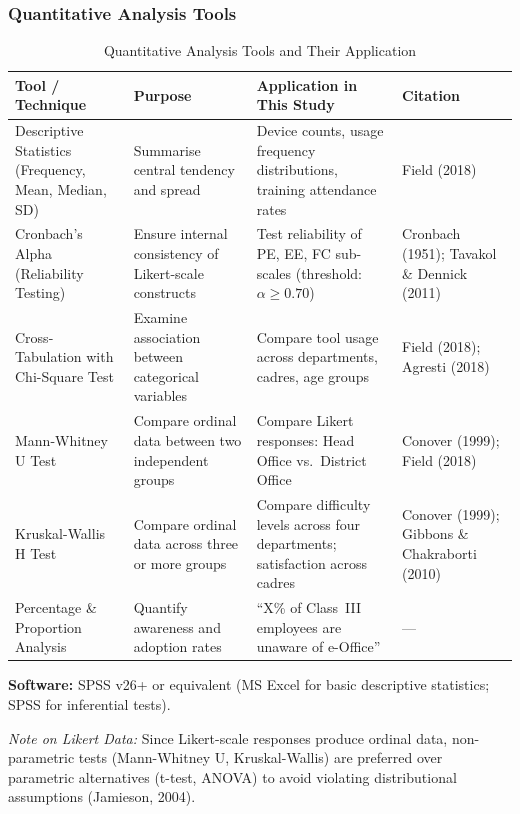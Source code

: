 \documentclass[12pt,a4paper]{article}
\begin{document}
\subsubsection{Quantitative Analysis Tools}

\begin{table}[H]
\centering
\caption{Quantitative Analysis Tools and Their Application}
\small
\begin{tabularx}{\textwidth}{L{3.2cm} L{2.8cm} X L{2.8cm}}
\toprule
\textbf{Tool / Technique} & \textbf{Purpose} & \textbf{Application in This Study} & \textbf{Citation} \\
\midrule
Descriptive Statistics (Frequency, Mean, Median, SD) & Summarise central tendency and spread & Device counts, usage frequency distributions, training attendance rates & Field (2018) \\[6pt]
Cronbach's Alpha (Reliability Testing) & Ensure internal consistency of Likert-scale constructs & Test reliability of PE, EE, FC sub-scales (threshold: $\alpha \geq 0.70$) & Cronbach (1951); Tavakol \& Dennick (2011) \\[6pt]
Cross-Tabulation with Chi-Square Test & Examine association between categorical variables & Compare tool usage across departments, cadres, age groups & Field (2018); Agresti (2018) \\[6pt]
Mann-Whitney U Test & Compare ordinal data between two independent groups & Compare Likert responses: Head Office vs.\ District Office & Conover (1999); Field (2018) \\[6pt]
Kruskal-Wallis H Test & Compare ordinal data across three or more groups & Compare difficulty levels across four departments; satisfaction across cadres & Conover (1999); Gibbons \& Chakraborti (2010) \\[6pt]
Percentage \& Proportion Analysis & Quantify awareness and adoption rates & ``X\% of Class~III employees are unaware of e-Office'' & --- \\
\bottomrule
\end{tabularx}
\end{table}

\textbf{Software:} SPSS v26+ or equivalent (MS Excel for basic descriptive statistics; SPSS for inferential tests).

\smallskip
\noindent\textit{Note on Likert Data:} Since Likert-scale responses produce ordinal data, non-parametric tests (Mann-Whitney U, Kruskal-Wallis) are preferred over parametric alternatives (t-test, ANOVA) to avoid violating distributional assumptions (Jamieson, 2004).
\end{document}
